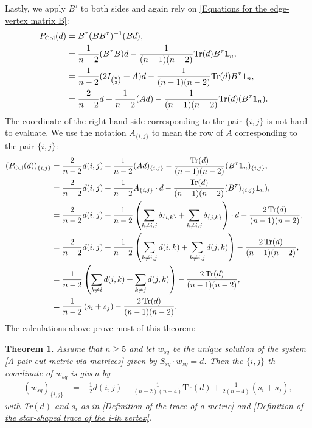 \documentclass[12pt]{amsart}
\newtheorem{theorem}{Theorem}
\numberwithin{theorem}{section}
\theoremstyle{remark}
\begin{document}
Lastly, we apply $B^\tau$ to both sides and again rely on \eqref{Equations for the edge-vertex matrix B}:
\begin{align*}
P_{\text{Col}}(d) &= B^\tau (BB^\tau)^{-1}(Bd), \cr
& = \frac{1}{n-2}(B^\tau B)d  - \frac{1}{(n-1)(n-2)} \text{Tr}(d) B^\tau \mathbf{1}_n, \cr 
& = \frac{1}{n-2}(2I_{n\choose 2} + A)d  - \frac{1}{(n-1)(n-2)} \text{Tr}(d) B^\tau \mathbf{1}_n, \cr 
& = \frac{2}{n-2}d + \frac{1}{n-2}(Ad)  - \frac{1}{(n-1)(n-2)} \text{Tr}(d) (B^\tau \mathbf{1}_n). 
\end{align*}
The coordinate of the right-hand side corresponding to the pair $\{i,j\}$ is not hard to evaluate. We use the notation $A_{\{i,j\}}$ to mean the row of $A$ corresponding to the pair $\{i,j\}$: 
\begin{align*}
(P_{\text{Col}}(d))_{\{i,j\}} & = \frac{2}{n-2}d(i,j) + \frac{1}{n-2}(Ad)_{\{i,j\}} - \frac{\text{Tr}(d)}{(n-1)(n-2)} (B^\tau \mathbf{1}_n)_{\{i,j\}}, \cr
& = \frac{2}{n-2}d(i,j) + \frac{1}{n-2}A_{\{i,j\}}\cdot d - \frac{\text{Tr}(d)}{(n-1)(n-2)} (B^\tau)_{\{i,j\}} \mathbf{1}_n), \cr
& = \frac{2}{n-2}d(i,j) + \frac{1}{n-2}\left(\sum_{k\ne i,j} \delta_{\{i,k\}} + \sum_{k\ne i,j} \delta_{\{j,k\}}\right)\cdot d - \frac{2\, \text{Tr}(d)}{(n-1)(n-2)},  \cr
& = \frac{2}{n-2}d(i,j) + \frac{1}{n-2}\left(\sum_{k\ne i,j} d(i,k) + \sum_{k\ne i, j} d(j,k) \right) - \frac{2\, \text{Tr}(d)}{(n-1)(n-2)},  \cr
& = \frac{1}{n-2}\left(\sum_{k\ne i} d(i,k) + \sum_{k\ne j} d(j,k) \right) - \frac{2\, \text{Tr}(d)}{(n-1)(n-2)},  \cr
& = \frac{1}{n-2}\left(s_i + s_j \right) - \frac{2\, \text{Tr}(d)}{(n-1)(n-2)}.
\end{align*}
The calculations above prove most of this theorem: 
\begin{theorem} \label{Main Theorem with Tiger Kung Fu built in}
Assume that $n\ge 5$ and let $w_{sq}$ be the unique solution of the system \eqref{A pair cut metric via matrices} given by $S_{sq}\cdot w_{sq} = d$. Then the $\{i,j\}$-th coordinate of $w_{sq}$ is given by 
\begin{align*}
(w_{sq})_{\{i,j\}} & =  -\frac{1}{2} d(i,j) -\frac{1}{(n-2)(n-4)} \text{Tr}(d) + \frac{1}{2(n-4)}  \left(s_i + s_j \right),	
\end{align*}
with Tr$(d)$ and $s_i$ as in \eqref{Definition of the trace of a metric} and \eqref{Definition of the star-shaped trace of the i-th vertex}.
\end{theorem} 
\end{document}
